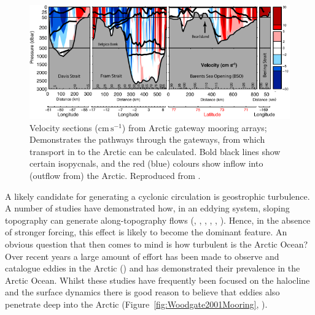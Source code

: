 \documentclass[12pt,a4paper]{report}
\newcommand*\figref[1]{Figure~\ref{#1}}
\begin{document}
\begin{figure}
	\centering
	\includegraphics[width=\linewidth]{Tsubouchi2012Transport}
	\caption[Adapted from \cite{tsubouchi2012arctic}]{Velocity
		sections ($\mathrm{cm}\, \mathrm{s}^{-1}$) from Arctic gateway mooring arrays;
		Demonstrates the pathways through the gateways, from which transport 
		in to the Arctic can be calculated.
		Bold black lines show certain isopycnals, and the red (blue) colours show inflow
		into (outflow from) the Arctic. Reproduced from \cite{tsubouchi2012arctic}.}
	\label{fig:Tsubouchi2012Transport}
\end{figure}

A likely candidate for generating a cyclonic circulation is
geostrophic turbulence. A number of studies have demonstrated how, in an eddying system, 
sloping topography can generate along-topography flows (\cite{bretherton1976two},  \cite{rhines1982homogenization},
\cite{treguier1989topographically}, \cite{salmon1998lectures}, \cite{adcock2000interactions}, \cite{nost2008asymmetry}). Hence, in the absence of stronger
forcing, this effect is likely to become the dominant feature. An obvious question that then
comes to mind is how turbulent is the Arctic Ocean? Over recent years a large amount  of 
effort has been made to observe and catalogue eddies in the Arctic
(\cite{zhao2014characterizing}) and has demonstrated their prevalence in the Arctic Ocean.
Whilst these studies have frequently been focused on the halocline and the surface dynamics
there is good reason to believe that eddies also penetrate deep into the Arctic 
(\figref{fig:Woodgate2001Mooring}, \cite{woodgate2001arctic}).
\end{document}

